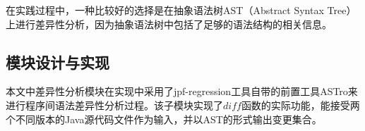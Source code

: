 在实践过程中，一种比较好的选择是在抽象语法树AST（Abstract Syntax Tree）上进行差异性分析，因为抽象语法树中包括了足够的语法结构的相关信息。

\subsection{模块设计与实现}

本文中差异性分析模块在实现中采用了jpf-regression工具自带的前置工具ASTro来进行程序间语法差异性分析过程。该子模块实现了$diff$函数的实际功能，能接受两个不同版本的Java源代码文件作为输入，并以AST的形式输出变更集合。

%
%
%
%
%
%
%
%
%
